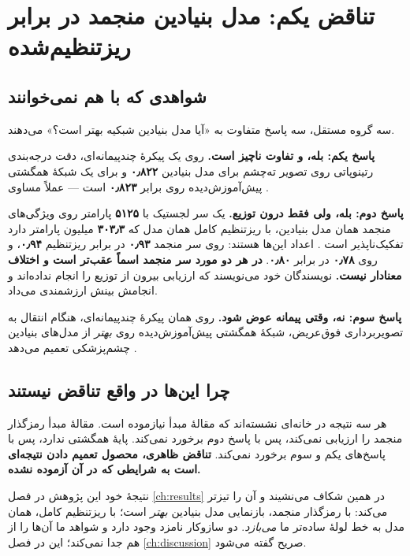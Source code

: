 \section{تناقض یکم: مدل بنیادین منجمد در برابر ریزتنظیم‌شده}
\label{sec:contradiction1}

\subsection{شواهدی که با هم نمی‌خوانند}

سه گروه مستقل، سه پاسخ متفاوت به «آیا مدل بنیادین شبکیه بهتر است؟» می‌دهند.

\textbf{پاسخ یکم: بله، و تفاوت ناچیز است.} روی یک پیکرهٔ چندپیمانه‌ای، دقت درجه‌بندی
رتینوپاتی روی تصویر ته‌چشم برای مدل بنیادین \textbf{\num{۰٫۸۲۲}} و برای یک شبکهٔ همگشتی
پیش‌آموزش‌دیده روی  برابر \textbf{\num{۰٫۸۲۳}} است — عملاً مساوی
\cite{tang2026mmrdr}.

\textbf{پاسخ دوم: بله، ولی فقط درون توزیع.} یک سر لجستیک با \textbf{\num{۵۱۲۵}} پارامتر روی
ویژگی‌های منجمد همان مدل بنیادین، با ریزتنظیم کامل همان مدل که \textbf{\num{۳۰۳٫۳}} میلیون
پارامتر دارد تفکیک‌ناپذیر است \cite{nielsen2025he}. اعداد این‌ها هستند: روی
 سر منجمد \textbf{\num{۰٫۹۳}} در برابر ریزتنظیم \textbf{\num{۰٫۹۴}}، و روی 
\textbf{\num{۰٫۷۸}} در برابر \textbf{\num{۰٫۸۰}}. \textbf{در هر دو مورد سر منجمد اسماً عقب‌تر است و
اختلاف معنادار نیست.} نویسندگان خود می‌نویسند که ارزیابی بیرون از توزیع را انجام نداده‌اند و
انجامش بینش ارزشمندی می‌داد.

\textbf{پاسخ سوم: نه، وقتی پیمانه عوض شود.} روی همان پیکرهٔ چندپیمانه‌ای، هنگام انتقال به
تصویربرداری فوق‌عریض، شبکهٔ همگشتی پیش‌آموزش‌دیده روی  \emph{بهتر} از مدل‌های
بنیادین چشم‌پزشکی تعمیم می‌دهد \cite{tang2026mmrdr}.

\subsection{چرا این‌ها در واقع تناقض نیستند}

هر سه نتیجه در خانه‌ای نشسته‌اند که مقالهٔ مبدأ نیازموده است. مقالهٔ مبدأ رمزگذار منجمد را
ارزیابی نمی‌کند، پس با پاسخ دوم برخورد نمی‌کند. پایهٔ همگشتی ندارد، پس با پاسخ‌های یکم و سوم
برخورد نمی‌کند. \textbf{تناقض ظاهری، محصول تعمیم دادن نتیجه‌ای است به شرایطی که در آن آزموده
نشده.}

نتیجهٔ خود این پژوهش در فصل \ref{ch:results} در همین شکاف می‌نشیند و آن را تیزتر می‌کند: با
رمزگذار منجمد، بازنمایی مدل بنیادین \emph{بهتر} است؛ با ریزتنظیم کامل، همان مدل به خط لولهٔ
ساده‌تر ما \emph{می‌بازد}. دو سازوکار نامزد وجود دارد و شواهد ما آن‌ها را از هم جدا نمی‌کند؛
این در فصل \ref{ch:discussion} صریح گفته می‌شود.

